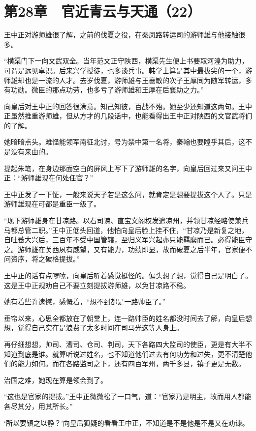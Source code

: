 \section{第28章　官近青云与天通（22）}

王中正对游师雄很了解，之前的伐夏之役，在秦凤路转运司的游师雄与他接触很多。

“横渠门下一向文武双全。当年范文正守陕西，横渠先生便上书要取河湟为助力，可谓是远见卓识。后来兴学授徒，也多谈兵事。韩学士算是其中最拔尖的一个，游师雄却也是一流的人才。去岁伐夏，游师雄与王襄敏的次子王厚同为随军转运，多有功勋。微臣的那点功劳，也多亏了游师雄和王厚在后襄助之力。”

向皇后对王中正的回答很满意。知己知彼，百战不殆。她至少还知道这两句。王中正虽然推重游师雄，但从方才的几段话中，也能看得出王中正对陕西的文官武将们的了解。

她暗暗点头。难怪能领军南征北讨，号为禁中第一名将，秦翰也要瞠乎其后，这不是没有来由的。

提起朱笔，在身边那面空白的屏风上写下了游师雄的名字，向皇后回过来又问王中正：“游师雄现在何处任官？”

王中正发了一下怔，一般来说天子若是这么问，就肯定是想要提拔这个人了。只是游师雄现在可都是重臣一级了。

“现下游师雄身在甘凉路。以右司谏、直宝文阁权发遣凉州，并领甘凉经略使兼兵马都总管二职。”王中正低头回道，他怕向皇后脸上挂不住，“甘凉乃是新复之地，自吐蕃大兴后，三百年不受中国管辖，至归义军兴起亦只能羁縻而已。必得能臣守之。游师雄在关西夙有威望，又有能力，功绩即显，故而破夏之后半年，官家便不问资序，将之破格提拔。”

王中正的话有点啰嗦，向皇后听着感觉挺怪的。偏头想了想，觉得自己是明白了。这是王中正规劝自己不要立刻提拔游师雄，以免甘凉路不稳。

她有着些许遗憾，感慨着，“想不到都是一路帅臣了。”

垂帘以来，心思全都放在了朝堂上，连一路帅臣的姓名都没时间去了解，向皇后想想，觉得自己实在是浪费了太多时间在司马光这等人身上。

再仔细想想，帅司、漕司、仓司、判司，天下各路四大监司的使臣，更是有大半不知道到底是谁。就算听说过姓名，也不知道他们过去有何功劳和过失，更不清楚他们的能力如何。而在各路监司之下，还有四百军州，两千多县，镇子更是无数。

治国之难，她现在算是领会到了。

“这也是官家的提拔。”王中正微微松了一口气，道：“官家乃是明主，故而用人都能各尽其分，用其所长。”

‘所以要镇之以静？’向皇后狐疑的看看王中正，不知道是不是他是不是又在劝谏。


